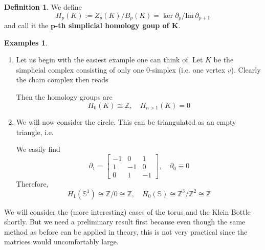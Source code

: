\documentclass[toc=bib, headinclude]{scrartcl}
\theoremstyle{plain}
\theoremstyle{definition}
\newtheorem	{definition}[theorem]{Definition}
\newtheorem{examples}[theorem]{Examples}
\theoremstyle{remark}
\newcommand{\isom}{\cong}
\newcommand{\Z}{\mathbb{Z}}
\newcommand{\Sp}{\mathbb{S}}
\newcommand{\im}{\mathrm{Im}\,}
\begin{document}
\begin{definition}
	We define \[
	H_p(K):=Z_p(K)/B_p(K)=\ker \partial_p/\im \partial_{p+1}
	\]
	and call it the \textbf{$\mathbf{p}$-th simplicial homology goup of $\mathbf{K}$}.
\end{definition}
\begin{examples}\mbox{}
	\begin{enumerate}

\item Let us begin with the easiest example one can think of. Let $K$ be the simplicial complex consisting of only one 0-simplex (i.e. one vertex $v$). Clearly the chain complex then reads

\begin{center}
\end{center}
Then the homology groups are \[
H_0(K)\isom\Z,\quad H_{n>1}(K)=0
\]


\item We will now consider the circle. This can be triangulated as an empty triangle, i.e.
\begin{center}
	
\end{center}

We easily find 
\[
\partial_1=\begin{bmatrix}
-1&0&1\\1&-1&0\\0&1&-1
\end{bmatrix},\quad \partial_0\equiv 0
\]
Therefore,
\[H_1(\Sp^1)\isom\Z/0\isom\Z,\quad H_0(\Sp)\isom\Z^3/\Z^2\isom\Z
\]

	\end{enumerate}

We will consider the (more interesting) cases of the torus and the Klein Bottle shortly. But we need a preliminary result first because even though the same method as before can be applied in theory, this is not very practical since the matrices would uncomfortably large.


\end{examples}
\end{document}
